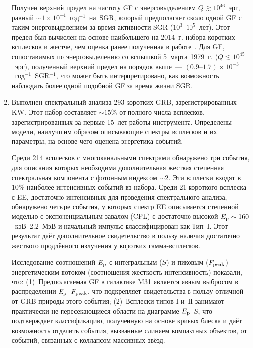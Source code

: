 \begin{enumerate}
    Получен верхний предел на частоту GF с энерговыделением $Q \gtrsim 10^{46}$~эрг, равный
    $\sim 1 \times 10^{-4}$~год$^{-1}$~на~SGR, который предполагает 
    около одной GF с таким энерговыделением за время активности SGR ($10^3\textrm{--}10^5$~лет). 
    Этот предел был вычислен на основе наибольшего на 2014~г.  
    набора коротких всплесков и жестче, чем оценка ранее полученная в работе~\citep{Ofek_2007ApJ}.
    Для GF, сопоставимых по энерговыделению со вспышкой 5~марта~1979~г. ($Q \lesssim 10^{45}$~эрг), 
    полученный верхний предел на порядок выше~--- $(0.9\textrm{--}1.7)\times 10^{-3}$~год$^{-1}$~SGR$^{-1}$, 
    что может быть интерпретировано, как возможность наблюдать более одной подобной GF за время жизни SGR.
  
\item Выполнен спектральный анализа 293 коротких GRB, зарегистрированных KW. 
    Этот набор составляет $\sim 15$\% от полного числа всплесков, зарегистрированных 
    за первые 15~лет работы инструмента.
    Определены модели, наилучшим образом описывающие спектры всплесков и их параметры,
    на основе чего оценена энергетика событий. 
    
    Среди 214 всплесков с многоканальными спектрами обнаружено три
    события, для описания которых необходима дополнительная жесткая степенная 
    спектральная компонента с фотонным индексом $\sim 2$. Эти всплески входят в 10\%
    наиболее интенсивных событий из набора. 
    Среди 21 короткого всплеска с EE, достаточно интенсивных
    для проведения спектрального анализа, обнаружено четыре события, у которых 
    спектр EE описывается степенной моделью с экспоненциальным завалом (CPL) 
    с достаточно высокой $E_{\mathrm{p}} \sim 160$~кэВ--2.2~МэВ и начальный импульс 
    классифицирован как Тип~I. Этот результат даёт дополнительное свидетельство 
    в пользу наличия достаточно жесткого продлённого излучения у коротких гамма-всплесков. 
    
    Исследование соотношений $E_{\mathrm{p}}$ с интегральным ($S$) и пиковым ($F_{\mathrm{peak}}$) 
    энергетическим потоком (соотношения жесткость-интенсивность) показали, что:
    (1)~Предполагаемая GF в галактике M31 является явным выбросом в распределении 
    $E_{\mathrm{p}}$--$F_{\mathrm{peak}}$,  что подкрепляет свидетельства в пользу отличной 
    от GRB природы этого события;
    (2)~Всплески типов I и~II занимают практически не пересекающиеся области 
    на диаграмме $E_{\mathrm{p}}$--$S$, что подтверждает классификацию, полученную на 
    основе кривых блеска и даёт возможность отделить события, 
    вызванные слиняем компактных объектов, от событий, связанных с коллапсом массивных звёзд.
  
\end{enumerate}


